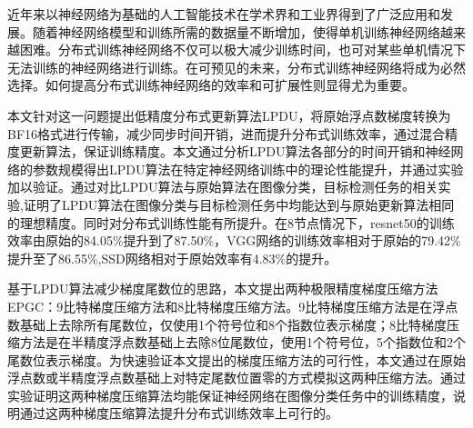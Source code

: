 \begin{cabstract}
近年来以神经网络为基础的人工智能技术在学术界和工业界得到了广泛应用和发展。随着神经网络模型和训练所需的数据量不断增加，使得单机训练神经网络越来越困难。分布式训练神经网络不仅可以极大减少训练时间，也可对某些单机情况下无法训练的神经网络进行训练。在可预见的未来，分布式训练神经网络将成为必然选择。如何提高分布式训练神经网络的效率和可扩展性则显得尤为重要。

本文针对这一问题提出低精度分布式更新算法LPDU，将原始浮点数梯度转换为BF16格式进行传输，减少同步时间开销，进而提升分布式训练效率，通过混合精度更新算法，保证训练精度。本文通过分析LPDU算法各部分的时间开销和神经网络的参数规模得出LPDU算法在特定神经网络训练中的理论性能提升，并通过实验加以验证。通过对比LPDU算法与原始算法在图像分类，目标检测任务的相关实验,证明了LPDU算法在图像分类与目标检测任务中均能达到与原始更新算法相同的理想精度。同时对分布式训练性能有所提升。在8节点情况下，resnet50的训练效率由原始的84.05\%提升到了87.50\%，VGG网络的训练效率相对于原始的79.42\%提升至了86.55\%,SSD网络相对于原始效率有4.83\%的提升。

基于LPDU算法减少梯度尾数位的思路，本文提出两种极限精度梯度压缩方法EPGC：9比特梯度压缩方法和8比特梯度压缩方法。9比特梯度压缩方法是在浮点数基础上去除所有尾数位，仅使用1个符号位和8个指数位表示梯度；8比特梯度压缩方法是在半精度浮点数基础上去除8位尾数位，使用1个符号位，5个指数位和2个尾数位表示梯度。为快速验证本文提出的梯度压缩方法的可行性，本文通过在原始浮点数或半精度浮点数基础上对特定尾数位置零的方式模拟这两种压缩方法。通过实验证明这两种梯度压缩算法均能保证神经网络在图像分类任务中的训练精度，说明通过这两种梯度压缩算法提升分布式训练效率上可行的。

\end{cabstract}

